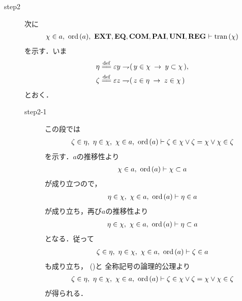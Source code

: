 \begin{sketch}
\begin{description}
			\item[step2] 次に
				\begin{align}
					\chi \in a,\ \ord{a},\ 
					\EXTAX,\EQAX,\COMAX,\PAIAX,\UNIAX,\REGAX \vdash \tran{\chi}
				\end{align}
				を示す．いま
				\begin{align}
					\eta &\defeq \varepsilon y \negation (\, y \in \chi \rarrow y \subset \chi\, ), \\
					\zeta &\defeq \varepsilon z \negation (\, z \in \eta \rarrow z \in \chi\, )
				\end{align}
				とおく．
				\begin{description}
					\item[step2-1]
						この段では
						\begin{align}
							\zeta \in \eta,\ \eta \in \chi,\ \chi \in a,\ \operatorname*{ord}\hspace{0.15em}(a) 
							\vdash 
							\zeta \in \chi \vee \zeta = \chi \vee \chi \in \zeta
						\end{align}
						を示す．$a$の推移性より
						\begin{align}
							\chi \in a,\ \operatorname*{ord}\hspace{0.15em}(a) \vdash \chi \subset a
						\end{align}
						が成り立つので，
						\begin{align}
							\eta \in \chi,\ \chi \in a,\ \operatorname*{ord}\hspace{0.15em}(a) \vdash \eta \in a
						\end{align}
						が成り立ち，再び$a$の推移性より
						\begin{align}
							\eta \in \chi,\ \chi \in a,\ \operatorname*{ord}\hspace{0.15em}(a) \vdash 
							\eta \subset a
						\end{align}
						となる．従って
						\begin{align}
							\zeta \in \eta,\ \eta \in \chi,\ \chi \in a,\ \operatorname*{ord}\hspace{0.15em}(a) 
							\vdash \zeta \in a
						\end{align}
						も成り立ち，
						()と
						全称記号の論理的公理より
						\begin{align}
							\zeta \in \eta,\ \eta \in \chi,\ \chi \in a,\ \operatorname*{ord}\hspace{0.15em}(a) 
							\vdash 
							\zeta \in \chi \vee \zeta = \chi \vee \chi \in \zeta
							\label{fom:thm_transitive_totally_ordered_class_5}
						\end{align}
						が得られる．
						

\end{description}
\end{description}
\end{sketch}
